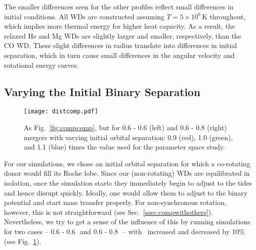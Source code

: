 
The smaller differences seen for the other profiles reflect small differences in initial conditions.  All WDs are constructed assuming $T=5\times10^6\,$K throughout, which implies more thermal energy for higher heat capacity.  As a result, the relaxed He and Mg WDs are slightly larger and smaller, respectively, than the CO WD.  These slight differences in radius translate into differences in initial separation, which in turn cause small differences in the angular velocity and rotational energy curves.

\subsection{Varying the Initial Binary Separation}
\label{ssec:varyingazero}

\begin{figure}
\centering
\texttt{[image: distcomp.pdf]}
\caption{As Fig.~\ref{fig:compcomp}, but for 0.6 - 0.6 {\Msun} (left) and 0.6 - 0.8 {\Msun} (right) mergers with varying initial orbital separation: 0.9 (red), 1.0 (green), and 1.1 (blue) times the value used for the parameter space study.}
\label{fig:distcomp}
\end{figure}

For our simulations, we chose an initial orbital separation {\azero} for which a co-rotating donor would fill its Roche lobe.  Since our (non-rotating) WDs are equilibrated in isolation, once the simulation starts they immediately begin to adjust to the tides and hence disrupt quickly.  Ideally, one would allow them to adjust to the binary potential and start mass transfer properly.  For non-synchronous rotation, however, this is not straightforward (see Sec.~\ref{ssec:compwithothers}).  Nevertheless, we try to get a sense of the influence of this by running simulations for two cases -- 0.6 - 0.6\,\Msun\ and 0.6 - 0.8\,\Msun\ -- with \azero\ increased and decreased by 10\% (see Fig.~\ref{fig:distcomp}).

